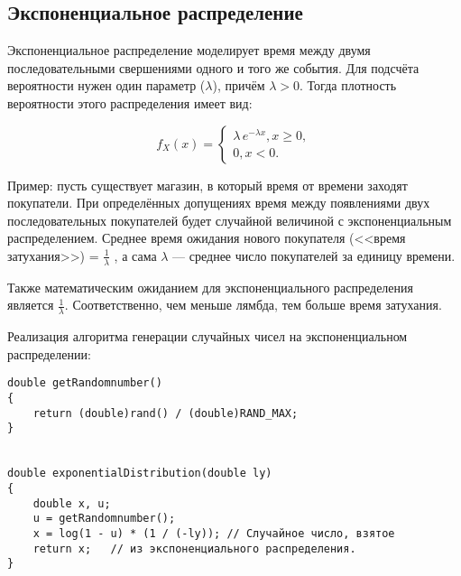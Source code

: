 \documentclass[bachelor, och, referat, times]{SCWorks}
\begin{document}
\subsection{Экспоненциальное распределение}
Экспоненциальное распределение моделирует время между двумя последовательными свершениями одного и того же события.
Для подсчёта вероятности нужен один параметр ($\lambda$), причём $\lambda > 0$. \cite{randNumGenDist} Тогда плотность вероятности этого распределения
имеет вид:

\begin{equation*}
f_{X}(x) = 
 \begin{cases}
   \lambda\,e^{{-\lambda x}}, x\ge 0, \\
   0, x<0.
 \end{cases}
\end{equation*}


Пример: пусть существует магазин, в который время от времени заходят покупатели. При определённых допущениях время между появлениями двух последовательных покупателей будет случайной величиной с экспоненциальным распределением. Среднее время ожидания нового покупателя (<<время затухания>>) = $ \frac{1}{\lambda} $ , а сама $\lambda$ --- среднее число покупателей за единицу времени.

Также математическим ожиданием для экспоненциального распределения является $ \frac{1}{\lambda} $. 
Соответственно, чем меньше лямбда, тем больше время затухания.

Реализация алгоритма генерации случайных чисел на экспоненциальном распределении:

\begin{verbatim}
double getRandomnumber()
{
	return (double)rand() / (double)RAND_MAX;
}


double exponentialDistribution(double ly)
{
	double x, u;
	u = getRandomnumber();
	x = log(1 - u) * (1 / (-ly)); // Случайное число, взятое
	return x;   // из экспоненциального распределения.
}
\end{verbatim}



\end{document}
